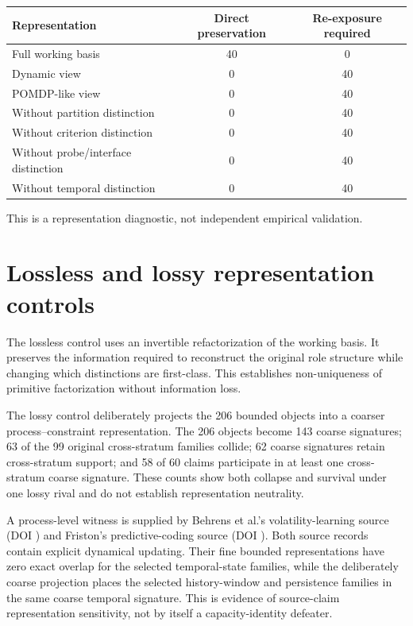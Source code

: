 \documentclass[11pt]{article}
\begin{document}
\begin{center}
\begin{tabular}{lcc}
\toprule
Representation & Direct preservation & Re-exposure required \\
\midrule
Full working basis & 40 & 0 \\
Dynamic view & 0 & 40 \\
POMDP-like view & 0 & 40 \\
Without partition distinction & 0 & 40 \\
Without criterion distinction & 0 & 40 \\
Without probe/interface distinction & 0 & 40 \\
Without temporal distinction & 0 & 40 \\
\bottomrule
\end{tabular}
\end{center}

This is a representation diagnostic, not independent empirical validation.

\section{Lossless and lossy representation controls}

The lossless control uses an invertible refactorization of the working basis. It preserves the information required to reconstruct the original role structure while changing which distinctions are first-class. This establishes non-uniqueness of primitive factorization without information loss.

The lossy control deliberately projects the 206 bounded objects into a coarser process--constraint representation. The 206 objects become 143 coarse signatures; 63 of the 99 original cross-stratum families collide; 62 coarse signatures retain cross-stratum support; and 58 of 60 claims participate in at least one cross-stratum coarse signature. These counts show both collapse and survival under one lossy rival and do not establish representation neutrality.

A process-level witness is supplied by Behrens et al.'s volatility-learning source (DOI ) and Friston's predictive-coding source (DOI ). Both source records contain explicit dynamical updating. Their fine bounded representations have zero exact overlap for the selected temporal-state families, while the deliberately coarse projection places the selected history-window and persistence families in the same coarse temporal signature. This is evidence of source-claim representation sensitivity, not by itself a capacity-identity defeater.
\end{document}
